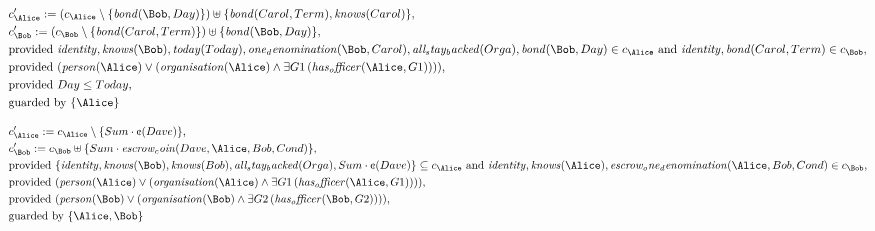 \begin{align*}
&
c'_
{
\Alice
}
 := 
(c_
{
\Alice
}
 \setminus 
\{
\mathit{
bond
}
(
\Bob
,
Day
)
\}
) \uplus 
\{
\mathit{
bond
}
(
Carol
,
Term
)
,
\mathit{
knows
}
(
Carol
)
\}
,\\
&
c'_
{
\Bob
}
 := 
(c_
{
\Bob
}
 \setminus 
\{
\mathit{
bond
}
(
Carol
,
Term
)
\}
) \uplus 
\{
\mathit{
bond
}
(
\Bob
,
Day
)
\}
,\\
&
\text{provided } 
\mathit{
identity
}
,
\mathit{
knows
}
(
\Bob
)
,
\mathit{
today
}
(
Today
)
,
\mathit{
one_denomination
}
(
\Bob
,
Carol
)
,
\mathit{
all_stay_backed
}
(
Orga
)
,
\mathit{
bond
}
(
\Bob
,
Day
)
 \in c_
{
\Alice
}
 \text{ and } 
\mathit{
identity
}
,
\mathit{
bond
}
(
Carol
,
Term
)
 \in c_
{
\Bob
}
,\\
&
\text{provided } 
(
\mathit{
person
}
(
\Alice
)
\lor
(
\mathit{
organisation
}
(
\Alice
)
\land
\exists 
G1
\,(
\mathit{
has_officer
}
(
\Alice
,
G1
)
)
)
)
,\\
&
\text{provided } 
Day
\le
Today
,\\
&
\text{guarded by } \{
\Alice
\}
\end{align*}

\begin{align*}
&
c'_
{
\Alice
}
 := 
c_
{
\Alice
}
 \setminus 
\{
Sum
\cdot
\text{\textcent}
(
Dave
)
\}
,\\
&
c'_
{
\Bob
}
 := 
c_
{
\Bob
}
 \uplus 
\{
Sum
\cdot
\mathit{
escrow_coin
}
(
Dave
,
\Alice
,
Bob
,
Cond
)
\}
,\\
&
\text{provided } 
\{
\mathit{
identity
}
,
\mathit{
knows
}
(
\Bob
)
,
\mathit{
knows
}
(
Bob
)
,
\mathit{
all_stay_backed
}
(
Orga
)
,
Sum
\cdot
\text{\textcent}
(
Dave
)
\}
 \subseteq c_
{
\Alice
}
 \text{ and } 
\mathit{
identity
}
,
\mathit{
knows
}
(
\Alice
)
,
\mathit{
escrow_one_denomination
}
(
\Alice
,
Bob
,
Cond
)
 \in c_
{
\Bob
}
,\\
&
\text{provided } 
(
\mathit{
person
}
(
\Alice
)
\lor
(
\mathit{
organisation
}
(
\Alice
)
\land
\exists 
G1
\,(
\mathit{
has_officer
}
(
\Alice
,
G1
)
)
)
)
,\\
&
\text{provided } 
(
\mathit{
person
}
(
\Bob
)
\lor
(
\mathit{
organisation
}
(
\Bob
)
\land
\exists 
G2
\,(
\mathit{
has_officer
}
(
\Bob
,
G2
)
)
)
)
,\\
&
\text{guarded by } \{
\Alice
,
\Bob
\}
\end{align*}

